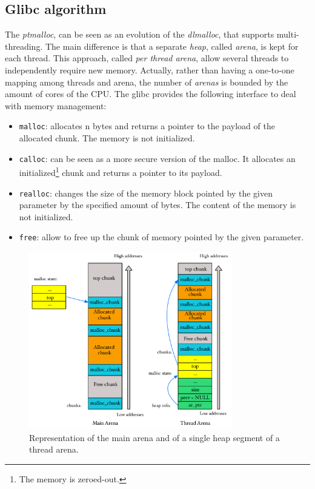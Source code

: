 \documentclass{article}
\numberwithin{equation}{subsection}
\begin{document}
\subsection{Glibc algorithm}
The \emph{ptmalloc}, can be seen as an evolution of the \emph{dlmalloc}, that supports multi-threading. The main difference is that a separate \emph{heap}, called \emph{arena}, is kept for each thread. This approach, called \emph{per thread arena}, allow several threads to independently require new memory. Actually, rather than having a one-to-one mapping among threads and arena, the number of \emph{arenas} is bounded by the amount of cores of the CPU.
The glibc provides the following interface to deal with memory management:
\begin{itemize}
    \item \texttt{malloc}: allocates n bytes and returns a pointer to the payload of the allocated chunk. The memory is not initialized.
    \item \texttt{calloc}: can be seen as a more secure version of the malloc. It allocates an initialized\footnote{The memory is zeroed-out.} chunk and returns a pointer to its payload.
    \item \texttt{realloc}: changes the size of the memory block pointed by the given parameter by the specified amount of bytes. The content of the memory is not initialized.
    \item \texttt{free}: allow to free up the chunk of memory pointed by the given parameter.
\end{itemize}
\begin{figure}[H]
    \centering
    \includegraphics[width=0.79\textwidth]{single_heap_segment.pdf}
    \caption{Representation of the main arena and of a single heap segment of a thread arena.}
    \label{fig:single_heap_segment}
\end{figure}
\end{document}
